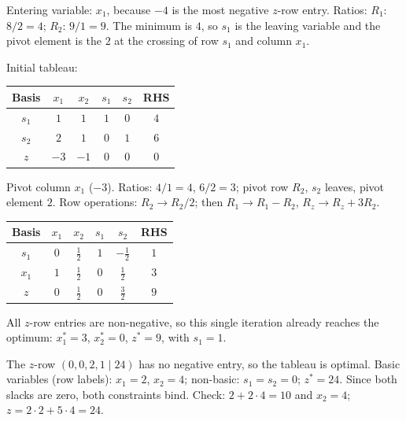\begin{solutions}
  \item Entering variable: $x_1$, because $-4$ is the most negative
        $z$-row entry. Ratios: $R_1$: $8/2=4$; $R_2$: $9/1=9$. The
        minimum is $4$, so $s_1$ is the leaving variable and the pivot
        element is the $2$ at the crossing of row $s_1$ and column
        $x_1$.

  \item Initial tableau:
        \begin{center}
        \begin{tabular}{c|cccc|c}
        Basis & $x_1$ & $x_2$ & $s_1$ & $s_2$ & RHS\\
        \hline
        $s_1$ & $1$ & $1$ & $1$ & $0$ & $4$\\
        $s_2$ & $2$ & $1$ & $0$ & $1$ & $6$\\
        \hline
        $z$ & $-3$ & $-1$ & $0$ & $0$ & $0$\\
        \end{tabular}
        \end{center}
        Pivot column $x_1$ ($-3$). Ratios: $4/1=4$, $6/2=3$; pivot row
        $R_2$, $s_2$ leaves, pivot element $2$. Row operations:
        $R_2\to R_2/2$; then $R_1\to R_1-R_2$, $R_z\to R_z+3R_2$.
        \begin{center}
        \begin{tabular}{c|cccc|c}
        Basis & $x_1$ & $x_2$ & $s_1$ & $s_2$ & RHS\\
        \hline
        $s_1$ & $0$ & $\tfrac{1}{2}$ & $1$ & $-\tfrac{1}{2}$ & $1$\\
        $x_1$ & $1$ & $\tfrac{1}{2}$ & $0$ & $\tfrac{1}{2}$ & $3$\\
        \hline
        $z$ & $0$ & $\tfrac{1}{2}$ & $0$ & $\tfrac{3}{2}$ & $9$\\
        \end{tabular}
        \end{center}
        All $z$-row entries are non-negative, so this single iteration
        already reaches the optimum: $x_1^{*}=3$, $x_2^{*}=0$,
        $z^{*}=9$, with $s_1=1$.

  \item The $z$-row $(0,0,2,1\mid 24)$ has no negative entry, so the
        tableau is optimal. Basic variables (row labels): $x_1=2$,
        $x_2=4$; non-basic: $s_1=s_2=0$; $z^{*}=24$. Since both slacks
        are zero, both constraints bind. Check: $2+2\cdot 4=10$ and
        $x_2=4$; $z=2\cdot 2+5\cdot 4=24$.


\end{solutions}

